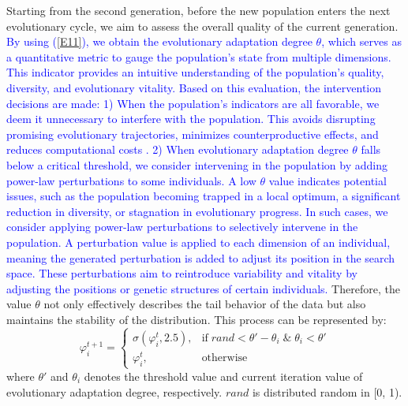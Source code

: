 \documentclass[journal,twoside]{IEEEtran}
\begin{document}
Starting from the second generation, before the new population enters the next evolutionary cycle, we aim to assess the overall quality of the current generation. \textcolor{blue}{By using (\ref{E11}), we obtain the evolutionary adaptation degree $\theta$, which serves as a quantitative metric to gauge the population’s state from multiple dimensions. This indicator provides an intuitive understanding of the population’s quality, diversity, and evolutionary vitality. Based on this evaluation, the intervention decisions are made: 1) When the population's indicators are all favorable, we deem it unnecessary to interfere with the population. This avoids disrupting promising evolutionary trajectories, minimizes counterproductive effects, and reduces computational costs \cite{JAS-2024-0370}. 2) When evolutionary adaptation degree $\theta$ falls below a critical threshold, we consider intervening in the population by adding power-law perturbations to some individuals. A low $\theta$ value indicates potential issues, such as the population becoming trapped in a local optimum, a significant reduction in diversity, or stagnation in evolutionary progress. In such cases, we consider applying power-law perturbations to selectively intervene in the population. A perturbation value is applied to each dimension of an individual, meaning the generated perturbation is added to adjust its position in the search space. These perturbations aim to reintroduce variability and vitality by adjusting the positions or genetic structures of certain individuals.} Therefore, the value $\theta$ not only effectively describes the tail behavior of the data but also maintains the stability of the distribution. This process can be represented by:
\begin{equation}\label{E18}
	\varphi_i^{t+1}= \begin{cases}\sigma\left(\varphi_i^{t}, 2.5\right), & \text{if}\; rand<\theta'- \theta_i \;\&\; \theta_i<\theta' \\ \varphi_i^{t}, & \text {otherwise}\end{cases}
\end{equation}
where $\theta'$ and $\theta_i$ denotes the threshold value and current iteration value of evolutionary adaptation degree, respectively. $rand$ is distributed random in [0, 1). 
\end{document}
